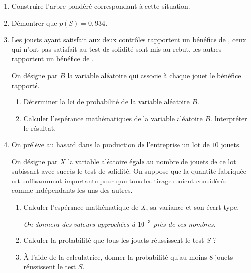 \documentclass[10pt,openright,twoside,french]{book}
\begin{document}
\begin{enumerate}
    \item Construire l'arbre pondéré correspondant à cette situation.
    \item Démontrer que $p(S) = 0,934$.
    \item Les jouets ayant satisfait aux deux contrôles rapportent un bénéfice de , ceux qui n'ont pas satisfait au test de solidité sont mis au rebut, les autres rapportent un bénéfice de .\par
        On désigne par $B$ la variable aléatoire qui associe à chaque jouet le bénéfice rapporté.
        \begin{enumerate}
            \item Déterminer la loi de probabilité de la variable aléatoire $B$.
            \item Calculer l'espérance mathématiques de la variable aléatoire $B$. Interpréter le résultat.
        \end{enumerate}
    \item On prélève au hasard dans la production de l'entreprise un lot de $10$ jouets.\par On désigne par $X$ la variable aléatoire égale au nombre de jouets de ce lot subissant avec succès le test de solidité. On suppose que la quantité fabriquée est suffisamment importante pour que tous les tirages soient considérés comme indépendants les uns des autres.
        \begin{enumerate}
            \item Calculer l'espérance mathématique de $X$, sa variance et son écart-type.\par
            \textit{On donnera des valeurs approchées à $10^{-3}$ près de ces nombres.}
            \item Calculer la probabilité que tous les jouets réussissent le test $S$ ?
            \item À l'aide de la calculatrice, donner la probabilité qu'au moins $8$ jouets réussissent le test $S$.
        \end{enumerate}
\end{enumerate}
\end{document}
